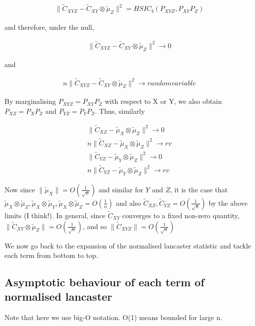 \documentclass{article}
\begin{document}
\begin{align*}
\|\tilde{C}_{XYZ} - \tilde{C}_{XY}\otimes \tilde{\mu}_Z\|^2 = HSIC_b(P_{XYZ},P_{XY}P_Z)
\end{align*}

and therefore, under the null,

\begin{align*}
\|\tilde{C}_{XYZ} - \tilde{C}_{XY}\otimes \tilde{\mu}_Z\|^2 \longrightarrow 0
\end{align*}

and

\begin{align*}
n\|\tilde{C}_{XYZ} - \tilde{C}_{XY}\otimes \tilde{\mu}_Z\|^2 \longrightarrow random variable
\end{align*}

By marginalising $P_{XYZ} = P_{XY}P_Z$ with respect to X or Y, we also obtain $P_{XZ} = P_XP_Z$ and $P_{YZ} = P_YP_Z$. Thus, similarly

\begin{align*}
\|\tilde{C}_{XZ} - \tilde{\mu}_X\otimes \tilde{\mu}_Z\|^2 \longrightarrow 0 \\
n\|\tilde{C}_{XZ} - \tilde{\mu}_X\otimes \tilde{\mu}_Z\|^2 \longrightarrow rv \\
\|\tilde{C}_{YZ} - \tilde{\mu}_Y\otimes \tilde{\mu}_Z\|^2 \longrightarrow 0 \\
n\|\tilde{C}_{YZ} - \tilde{\mu}_Y\otimes \tilde{\mu}_Z\|^2 \longrightarrow rv
\end{align*}

Now since $\|\tilde{\mu}_X\| = O(\frac{1}{\sqrt{n}})$ and similar for $Y$ and $Z$, it is the case that $\tilde{\mu}_X\otimes \tilde{\mu}_Z, \tilde{\mu}_X\otimes \tilde{\mu}_Y, \tilde{\mu}_X\otimes \tilde{\mu}_Z = O(\frac{1}{n})$ and also $\tilde{C}_{XZ},\tilde{C}_{YZ} = O(\frac{1}{\sqrt{n}})$ by the above limits (I think!). In general, since $\tilde{C}_{XY}$ converges to a fixed non-zero quantity, $\|\tilde{C}_{XY}\otimes \tilde{\mu}_Z\| = O(\frac{1}{\sqrt{n}})$, and so $\|\tilde{C}_{XYZ}\| = O(\frac{1}{\sqrt{n}})$

We now go back to the expansion of the normalised lancaster statistic and tackle each term from bottom to top.

\subsection{Asymptotic behaviour of each term of normalised lancaster}

Note that here we use big-O notation. O(1) means bounded for large n.
\end{document}
